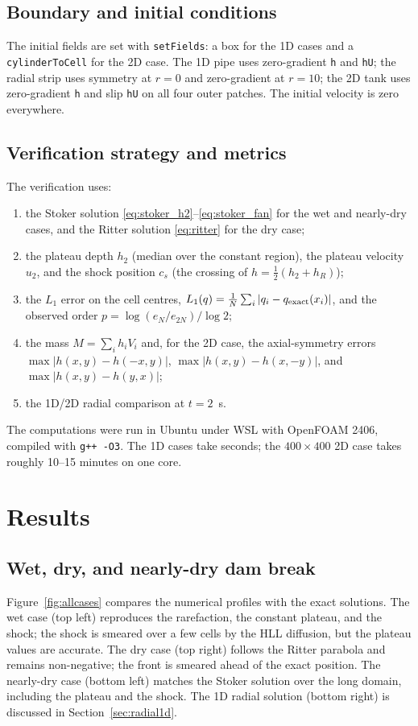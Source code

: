 ﻿\documentclass[11pt,a4paper]{article}
\begin{document}
\subsection{Boundary and initial conditions}
The initial fields are set with \texttt{setFields}: a box for the 1D cases and
a \texttt{cylinderToCell} for the 2D case.  The 1D pipe uses zero-gradient
\texttt{h} and \texttt{hU}; the radial strip uses symmetry at $r=0$ and
zero-gradient at $r=10$; the 2D tank uses zero-gradient \texttt{h} and slip
\texttt{hU} on all four outer patches.  The initial velocity is zero
everywhere.

\subsection{Verification strategy and metrics}
The verification uses:
\begin{enumerate}[leftmargin=1.4em,itemsep=1pt,topsep=2pt]
\item the Stoker solution \eqref{eq:stoker_h2}--\eqref{eq:stoker_fan} for the
      wet and nearly-dry cases, and the Ritter solution \eqref{eq:ritter} for
      the dry case;
\item the plateau depth $h_2$ (median over the constant region), the plateau
      velocity $u_2$, and the shock position $c_s$ (the crossing of
      $h=\tfrac12(h_2+h_R)$);
\item the $L_1$ error on the cell centres,
      $L_1(q)=\frac{1}{N}\sum_i|q_i-q_{\rm exact}(x_i)|$, and the observed
      order $p=\log(e_N/e_{2N})/\log 2$;
\item the mass $M=\sum_i h_iV_i$ and, for the 2D case, the axial-symmetry
      errors $\max|h(x,y)-h(-x,y)|$, $\max|h(x,y)-h(x,-y)|$, and
      $\max|h(x,y)-h(y,x)|$;
\item the 1D/2D radial comparison at $t=2$~s.
\end{enumerate}
The computations were run in Ubuntu under WSL with OpenFOAM 2406, compiled
with \texttt{g++ -O3}.  The 1D cases take seconds; the $400\times400$ 2D case
takes roughly 10--15 minutes on one core.

\section{Results}
\label{sec:results}

\subsection{Wet, dry, and nearly-dry dam break}
Figure~\ref{fig:allcases} compares the numerical profiles with the exact
solutions.  The wet case (top left) reproduces the rarefaction, the constant
plateau, and the shock; the shock is smeared over a few cells by the HLL
diffusion, but the plateau values are accurate.  The dry case (top right)
follows the Ritter parabola and remains non-negative; the front is smeared
ahead of the exact position.  The nearly-dry case (bottom left) matches the
Stoker solution over the long domain, including the plateau and the shock.
The 1D radial solution (bottom right) is discussed in
Section~\ref{sec:radial1d}.
\end{document}

